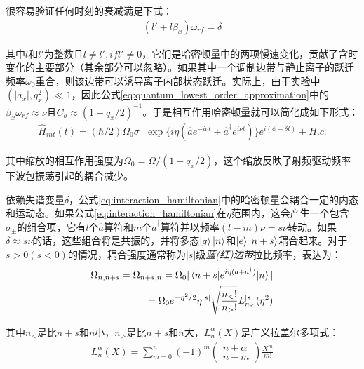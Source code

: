 很容易验证任何时刻的衰减满足下式：
\begin{align}
    (l'+l\beta_x)\omega_{rf}=\delta
\end{align}

其中$l$和$l'$为整数且$l\neq l', if l'\neq 0$，它们是哈密顿量中的两项慢速变化，贡献了含时变化的主要部分（其余部分可以忽略）。如果其中一个调制边带与静止离子的跃迁频率$\omega_0$重合，则该边带可以诱导离子内部状态跃迁。实际上，由于实验中$(|a_x|,q_x^2)\ll 1$，因此公式\eqref{eq:quantum_lowest_order_approximation}中的$\beta_x\omega_{rf}\approx\nu$且$C_o\approx(1+q_x/2)^{-1}$。于是相互作用哈密顿量就可以简化成如下形式：
\begin{align}
    \hat{H}_{int}(t)=(\hbar/2)\Omega_0\sigma_+ \exp\{i\eta(\hat{a}e^{-i\nu t}+\hat{a}^\dagger e^{i\nu t})\}e^{i(\phi-\delta t)}+ H.c. \label{eq:interaction_hamiltonian}
\end{align}

其中缩放的相互作用强度为$\Omega_0=\Omega/(1+q_x/2)$，这个缩放反映了射频驱动频率下波包振荡引起的耦合减少。



依赖失谐变量$\delta$，公式\eqref{eq:interaction_hamiltonian}中的哈密顿量会耦合一定的内态和运动态。如果公式\eqref{eq:interaction_hamiltonian}在$\eta$范围内，这会产生一个包含$\sigma_{\pm}$的组合项，它有$l$个$\hat{a}$算符和$m$个$\hat{a}^\dagger$算符并以频率$(l-m)\nu=s\nu$转动。如果$\delta\approx s\nu$的话，这些组合将是共振的，并将多态$\ket{g}\ket{n}$和$\ket{e}\ket{n+s}$耦合起来。对于$s>0(s<0)$的情况，耦合强度通常称为$|s|$级\emph{蓝(红)边带}拉比频率，表达为\cite[]{Leibfried_Meekhof_King_Monroe_Itano_Wineland_2002, Beige_Bose_Braun_Huelga_Knight_Plenio_Vedral_2000}：
\begin{align}
    \Omega_{n,n+s}=\Omega_{n+s,n}=\Omega_0|\braket{n+s|e^{i\eta(a+a^\dagger)}|n}|\\
    =\Omega_0 e^{-\eta^2/2}\eta^{|s|}\sqrt{\frac{n_<!}{n_>!}}L_{n_<}^{|s|}(\eta^2)
\end{align}

其中$n_<$是比$n+s$和$n$小，$n_>$是比$n+s$和$n$大，$L_n^\alpha(X)$是广义拉盖尔多项式：
\begin{align}
    L_n^\alpha(X)=\sum_{m=0}^{n}(-1)^m\begin{pmatrix}
        n+\alpha \\ n-m
    \end{pmatrix}\frac{X^m}{m!}
\end{align}


